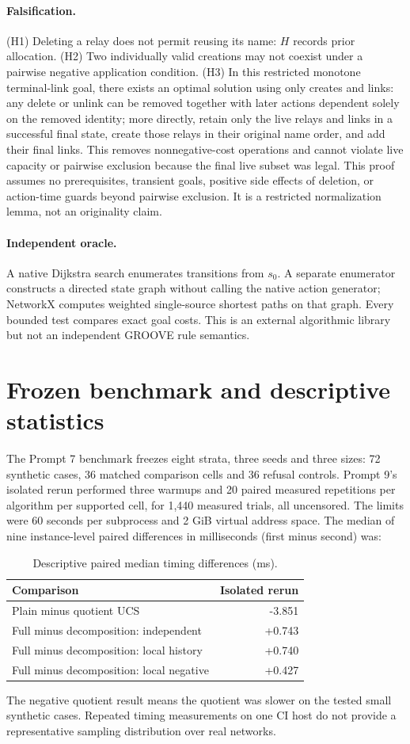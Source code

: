 \documentclass[10pt,a4paper]{article}
\begin{document}
\paragraph{Falsification.} (H1) Deleting a relay does not permit reusing its name: $H$ records prior allocation. (H2) Two individually valid creations may not coexist under a pairwise negative application condition. (H3) In this restricted monotone terminal-link goal, there exists an optimal solution using only creates and links: any delete or unlink can be removed together with later actions dependent solely on the removed identity; more directly, retain only the live relays and links in a successful final state, create those relays in their original name order, and add their final links. This removes nonnegative-cost operations and cannot violate live capacity or pairwise exclusion because the final live subset was legal. This proof assumes no prerequisites, transient goals, positive side effects of deletion, or action-time guards beyond pairwise exclusion. It is a restricted normalization lemma, not an originality claim.
\paragraph{Independent oracle.} A native Dijkstra search enumerates transitions from $s_0$. A separate enumerator constructs a directed state graph without calling the native action generator; NetworkX computes weighted single-source shortest paths on that graph. Every bounded test compares exact goal costs. This is an external algorithmic library but not an independent GROOVE rule semantics.
\section{Frozen benchmark and descriptive statistics}
The Prompt 7 benchmark freezes eight strata, three seeds and three sizes: 72 synthetic cases, 36 matched comparison cells and 36 refusal controls. Prompt 9's isolated rerun performed three warmups and 20 paired measured repetitions per algorithm per supported cell, for 1,440 measured trials, all uncensored. The limits were 60 seconds per subprocess and 2 GiB virtual address space. The median of nine instance-level paired differences in milliseconds (first minus second) was:
\begin{table}[ht]\centering\caption{Descriptive paired median timing differences (ms).}\begin{tabular}{lr}\toprule Comparison & Isolated rerun\\\midrule Plain minus quotient UCS & -3.851\\ Full minus decomposition: independent & +0.743\\ Full minus decomposition: local history & +0.740\\ Full minus decomposition: local negative & +0.427\\\bottomrule\end{tabular}\end{table}
The negative quotient result means the quotient was slower on the tested small synthetic cases. Repeated timing measurements on one CI host do not provide a representative sampling distribution over real networks.
\end{document}
